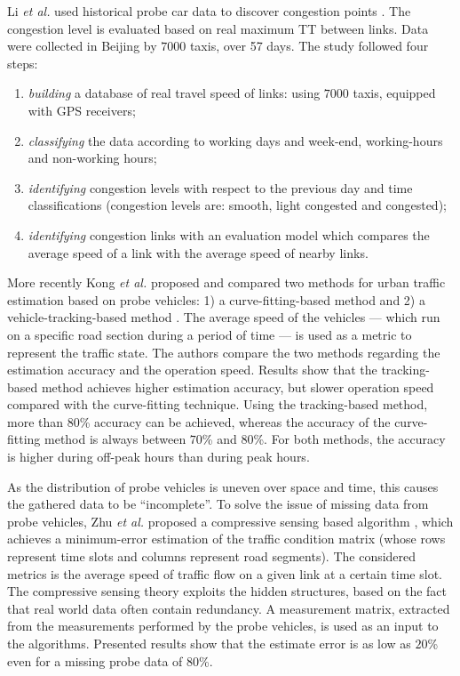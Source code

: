 \documentclass[10pt,onecolumn]{article}
\begin{document}
Li \textit{et al.} used historical probe car data to discover congestion points \cite{Li2009}. The congestion level is evaluated based on real maximum TT between links. Data were collected in Beijing by $7000$ taxis, over 57 days. The study followed four steps: 
\begin{enumerate}
\item \textit{building} a database of real travel speed of links: using $7000$ taxis, equipped with GPS receivers;
\item \textit{classifying} the data according to working days and week-end, working-hours and non-working hours;
\item \textit{identifying} congestion levels with respect to the previous day and time classifications (congestion levels are: smooth, light congested and congested);
\item \textit{identifying} congestion links with an evaluation model which compares the average speed of a link with the average speed of nearby links.
\end{enumerate}

More recently Kong \textit{et al.} proposed and compared two methods for urban traffic estimation based on probe vehicles: 1) a curve-fitting-based method and 2) a vehicle-tracking-based method \cite{Kong2013}. 
The average speed of the vehicles --- which run on a specific road section during a period of time --- is used as a metric to represent the traffic state.
The authors compare the two methods regarding the estimation accuracy and the operation speed.
Results show that the tracking-based method achieves higher estimation accuracy, but slower operation speed compared with the curve-fitting technique. Using the tracking-based method, more than $80$\% accuracy can be achieved, whereas the accuracy of the curve-fitting method is always between $70$\% and $80$\%. For both methods, the accuracy is higher during off-peak hours than during peak hours.

As the distribution of probe vehicles is uneven over space and time, this causes the gathered data to be ``incomplete''. To solve the issue of missing data from probe vehicles, Zhu \textit{et al.} proposed a compressive sensing based algorithm \cite{Zhu2013}, which achieves a minimum-error estimation of the traffic condition matrix (whose rows represent time slots and columns represent road segments). The considered metrics is the average speed of traffic flow on a given link at a certain time slot. The compressive sensing theory exploits the hidden structures, based on the fact that real world data often contain redundancy. A measurement matrix, extracted from the measurements performed by the probe vehicles, is used as an input to the algorithms. Presented results show that the estimate error is as low as $20$\% even for a missing probe data of $80$\%.
\end{document}
